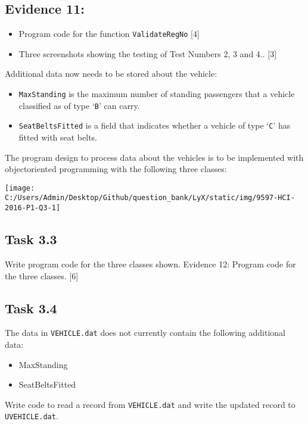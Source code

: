 \subsection*{Evidence 11:}
\begin{itemize}
\item Program code for the function \texttt{ValidateRegNo}\hfill{} {[}4{]}
\item Three screenshots showing the testing of Test Numbers 2, 3 and 4..
\hfill{}{[}3{]}
\end{itemize}
Additional data now needs to be stored about the vehicle:
\begin{itemize}
\item \texttt{MaxStanding} is the maximum number of standing passengers
that a vehicle classified as of type \textquoteleft \texttt{B}\textquoteright{}
can carry.
\item \texttt{SeatBeltsFitted} is a field that indicates whether a vehicle
of type \textquoteleft \texttt{C}\textquoteright{} has fitted with
seat belts.
\end{itemize}
The program design to process data about the vehicles is to be implemented
with objectoriented programming with the following three classes: 
\begin{center}
\texttt{[image: C:/Users/Admin/Desktop/Github/question\_bank/LyX/static/img/9597-HCI-2016-P1-Q3-1]}
\par\end{center}

\subsection*{Task 3.3 }

Write program code for the three classes shown. Evidence 12: Program
code for the three classes. \hfill{}{[}6{]}

\subsection*{Task 3.4 }

The data in \texttt{VEHICLE.dat} does not currently contain the following
additional data: 
\begin{itemize}
\item MaxStanding 
\item SeatBeltsFitted 
\end{itemize}
Write code to read a record from \texttt{VEHICLE.dat} and write the
updated record to \texttt{UVEHICLE.dat}.

